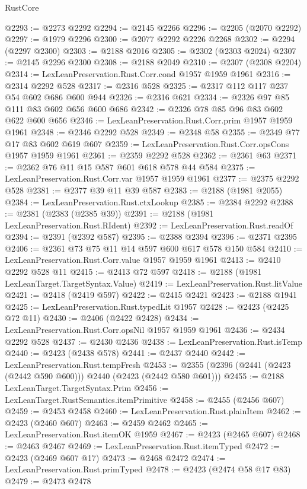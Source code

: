 \begin{lexlean}{RustCore}
\begin{coremodule}
@2293 := @2273 @2292
@2294 := @2145 @2266
@2296 := @2205 (@2070 @2292)
@2297 := @1979 @2296
@2300 := @2077 @2292 @2226 @2268
@2302 := @2294 (@2297 @2300)
@2303 := @2188 @2016
@2305 := @2302 (@2303 @2024)
@2307 := @2145 @2296 @2300
@2308 := @2188 @2049
@2310 := @2307 (@2308 @2204)
@2314 := LexLeanPreservation.Rust.Corr.cond @1957 @1959 @1961
@2316 := @2314 @2292 @528
@2317 := @2316 @528
@2325 := @2317 @112 @117 @237 @54 @602 @686 @600 @944
@2326 := @2316 @621
@2334 := @2326 @97 @85 @111 @83 @602 @656 @600 @686
@2342 := @2326 @78 @85 @96 @83 @602 @622 @600 @656
@2346 := LexLeanPreservation.Rust.Corr.prim @1957 @1959 @1961
@2348 := @2346 @2292 @528
@2349 := @2348 @58
@2355 := @2349 @77 @17 @83 @602 @619 @607
@2359 := LexLeanPreservation.Rust.Corr.opsCons @1957 @1959 @1961
@2361 := @2359 @2292 @528
@2362 := @2361 @63
@2371 := @2362 @76 @11 @15 @587 @601 @618 @578 @44 @584
@2375 := LexLeanPreservation.Rust.Corr.var @1957 @1959 @1961
@2377 := @2375 @2292 @528
@2381 := @2377 @39 @11 @39 @587
@2383 := @2188 (@1981 @2055)
@2384 := LexLeanPreservation.Rust.ctxLookup
@2385 := @2384 @2292
@2388 := @2381 (@2383 (@2385 @39))
@2391 := @2188 (@1981 LexLeanPreservation.Rust.RIdent)
@2392 := LexLeanPreservation.Rust.readOf
@2394 := @2391 (@2392 @587)
@2395 := @2388 @2394
@2396 := @2371 @2395
@2406 := @2361 @73 @75 @11 @14 @597 @600 @617 @578 @150 @584
@2410 := LexLeanPreservation.Rust.Corr.value @1957 @1959 @1961
@2413 := @2410 @2292 @528 @11
@2415 := @2413 @72 @597
@2418 := @2188 (@1981 LexLeanTarget.TargetSyntax.Value)
@2419 := LexLeanPreservation.Rust.litValue
@2421 := @2418 (@2419 @597)
@2422 := @2415 @2421
@2423 := @2188 @1941
@2425 := LexLeanPreservation.Rust.typedLit @1957
@2428 := @2423 (@2425 @72 @11)
@2430 := @2406 (@2422 @2428)
@2434 := LexLeanPreservation.Rust.Corr.opsNil @1957 @1959 @1961
@2436 := @2434 @2292 @528
@2437 := @2430 @2436
@2438 := LexLeanPreservation.Rust.isTemp
@2440 := @2423 (@2438 @578)
@2441 := @2437 @2440
@2442 := LexLeanPreservation.Rust.tempFresh
@2453 := @2355 (@2396 (@2441 (@2423 (@2442 @590 @600))) @2440 (@2423 (@2442 @580 @601)))
@2455 := @2188 LexLeanTarget.TargetSyntax.Prim
@2456 := LexLeanTarget.RustSemantics.itemPrimitive
@2458 := @2455 (@2456 @607)
@2459 := @2453 @2458
@2460 := LexLeanPreservation.Rust.plainItem
@2462 := @2423 (@2460 @607)
@2463 := @2459 @2462
@2465 := LexLeanPreservation.Rust.itemOK @1959
@2467 := @2423 (@2465 @607)
@2468 := @2463 @2467
@2469 := LexLeanPreservation.Rust.itemTyped
@2472 := @2423 (@2469 @607 @17)
@2473 := @2468 @2472
@2474 := LexLeanPreservation.Rust.primTyped
@2478 := @2423 (@2474 @58 @17 @83)
@2479 := @2473 @2478

\end{coremodule}
\end{lexlean}

